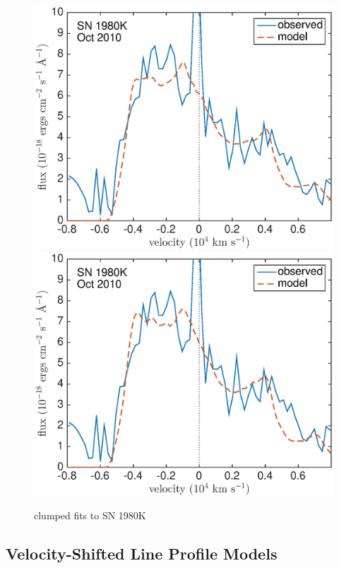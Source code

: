 \begin{figure}
\includegraphics[scale=0.4,clip=true, trim=20 0 40 20]{chapters/chapter6/figs/80K/clumped/OI}
\includegraphics[scale=0.4,clip=true, trim=20 0 40 20]{chapters/chapter6/figs/80K/clumped/OI_amC}
\caption{clumped fits to SN 1980K}
\label{80K_clumped}
\end{figure}

\subsection{Velocity-Shifted Line Profile Models}


